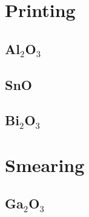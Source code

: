 \documentclass[../Matt_Gebert_Honours_Thesis.tex]{subfiles}
\begin{document}

	\section{Printing}
	\subsection{Al$_2$O$_3$}
	\subsection{SnO}
	\subsection{Bi$_2$O$_3$}
	
	\section{Smearing}
	\subsection{Ga$_2$O$_3$}
\end{document}
